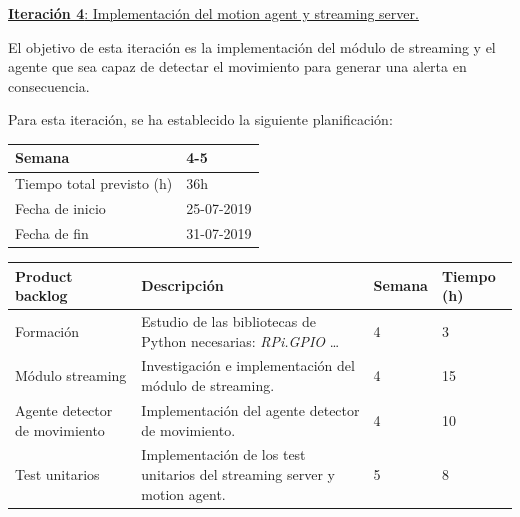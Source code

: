 
\large{\underline{\textbf{Iteración 4}: Implementación del motion agent y streaming server.}}
\vspace{0.3cm}

\normalsize

El objetivo de esta iteración es la implementación del módulo de streaming y el agente que sea capaz de detectar el movimiento para generar una alerta en consecuencia.

Para esta iteración, se ha establecido la siguiente planificación:

\begin{table}[h!]
\centering
\begin{tabular}{|p{5cm}|p{4cm}|}
 \hline
	\cellcolor[gray]{0.9} Semana  & 4-5 \\ \hline
	\cellcolor[gray]{0.9} Tiempo total previsto (h)  & 36h \\ \hline
	\cellcolor[gray]{0.9} Fecha de inicio  & 25-07-2019 \\ \hline
	\cellcolor[gray]{0.9} Fecha de fin  & 31-07-2019 \\ \hline
		
\end{tabular}
\end{table}

\begin{table}[h!]
\begin{tabular}{|p{4cm}|p{7.2cm}|p{1.3cm}|p{2.1cm}|}
\hline
\rowcolor[HTML]{9B9B9B} 
{\color[HTML]{FFFFFF} Product backlog} & {\color[HTML]{FFFFFF} Descripción}                                  & {\color[HTML]{FFFFFF} Semana} & {\color[HTML]{FFFFFF}Tiempo (h)} \\ \hline
Formación                          & Estudio de las bibliotecas de Python necesarias: \textit{RPi.GPIO} \ldots
                                        & 4                            & 3                                   \\ \hline
Módulo streaming                        & Investigación e implementación del módulo de streaming.
                                  & 4                             & 15                                  \\ \hline
Agente detector de movimiento                       & Implementación del agente detector de movimiento.
          & 4                             & 10                                   \\ \hline
Test unitarios                         & Implementación de los test unitarios del streaming server y motion agent.
          & 5                             & 8                                   \\ \hline

\end{tabular}
\end{table}

